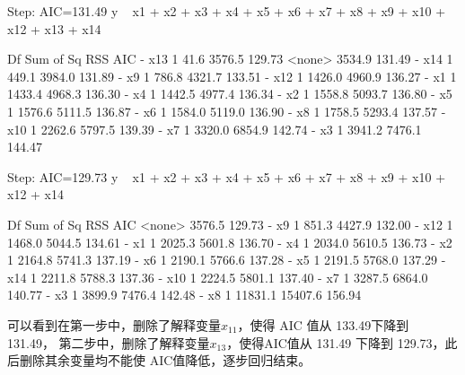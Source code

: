 \documentclass [a4paper]{article}
\begin{document}
Step:  AIC=131.49
y ~ x1 + x2 + x3 + x4 + x5 + x6 + x7 + x8 + x9 + x10 + x12 +
    x13 + x14

       Df Sum of Sq    RSS    AIC
- x13   1      41.6 3576.5 129.73
<none>              3534.9 131.49
- x14   1     449.1 3984.0 131.89
- x9    1     786.8 4321.7 133.51
- x12   1    1426.0 4960.9 136.27
- x1    1    1433.4 4968.3 136.30
- x4    1    1442.5 4977.4 136.34
- x2    1    1558.8 5093.7 136.80
- x5    1    1576.6 5111.5 136.87
- x6    1    1584.0 5119.0 136.90
- x8    1    1758.5 5293.4 137.57
- x10   1    2262.6 5797.5 139.39
- x7    1    3320.0 6854.9 142.74
- x3    1    3941.2 7476.1 144.47

Step:  AIC=129.73
y ~ x1 + x2 + x3 + x4 + x5 + x6 + x7 + x8 + x9 + x10 + x12 +
    x14

       Df Sum of Sq     RSS    AIC
<none>               3576.5 129.73
- x9    1     851.3  4427.9 132.00
- x12   1    1468.0  5044.5 134.61
- x1    1    2025.3  5601.8 136.70
- x4    1    2034.0  5610.5 136.73
- x2    1    2164.8  5741.3 137.19
- x6    1    2190.1  5766.6 137.28
- x5    1    2191.5  5768.0 137.29
- x14   1    2211.8  5788.3 137.36
- x10   1    2224.5  5801.1 137.40
- x7    1    3287.5  6864.0 140.77
- x3    1    3899.9  7476.4 142.48
- x8    1   11831.1 15407.6 156.94

可以看到在第一步中，删除了解释变量$x_{11}$，使得 AIC 值从 133.49下降到 131.49，
第二步中，删除了解释变量$x_{13}$，使得AIC值从 131.49 下降到 129.73，此后删除其余变量均不能使 AIC值降低，逐步回归结束。
\end{document}
